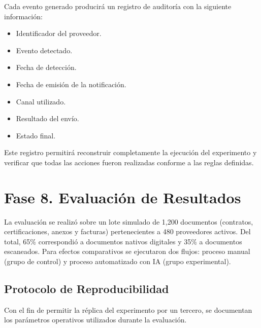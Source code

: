 \documentclass[12pt]{article}
\begin{document}
Cada evento generado producirá un registro de auditoría con la siguiente información:

\begin{itemize}
    \item Identificador del proveedor.
    \item Evento detectado.
    \item Fecha de detección.
    \item Fecha de emisión de la notificación.
    \item Canal utilizado.
    \item Resultado del envío.
    \item Estado final.
\end{itemize}

Este registro permitirá reconstruir completamente la ejecución del experimento y verificar que todas las acciones fueron realizadas conforme a las reglas definidas.

\section{Fase 8. Evaluación de Resultados}

La evaluación se realizó sobre un lote simulado de 1,200 documentos (contratos, certificaciones, anexos y facturas) pertenecientes a 480 proveedores activos. Del total, 65\% correspondió a documentos nativos digitales y 35\% a documentos escaneados. Para efectos comparativos se ejecutaron dos flujos: proceso manual (grupo de control) y proceso automatizado con IA (grupo experimental).

\subsection{Protocolo de Reproducibilidad}

Con el fin de permitir la réplica del experimento por un tercero, se documentan los parámetros operativos utilizados durante la evaluación.
\end{document}
